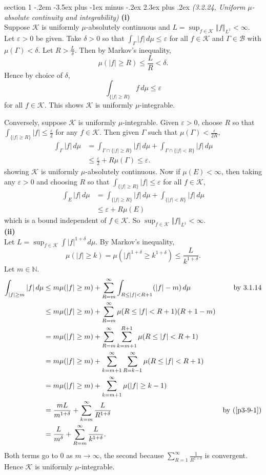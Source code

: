 \documentclass[12pt]{article}
\makeatletter
\theoremstyle{norm}
\newcommand{\N}[0]{\mathbb{N}}
\providecommand{\cal}[1]{\mathcal{#1}}
\renewcommand{\cal}[1]{\mathcal{#1}}
\newcommand{\rc}[1]{\frac{1}{#1}}
\newcommand{\Ga}[0]{\Gamma}
\newcommand{\de}[0]{\delta}
\newcommand{\ep}[0]{\varepsilon}
\newcommand{\eph}[0]{\frac{\varepsilon}{2}}
\newcommand{\by}[1]{\text{by~(\ref{#1})}}
\newcommand{\subprob}[1]{\noindent\textbf{#1}\\}
\newcommand{\iy}[0]{\infty}
\newcommand{\nl}[1]{\left \Vert #1\right \Vert_{L^1}}
\newenvironment{problem}{\@startsection
       {section}
       {1}
       {-.2em}
       {-3.5ex plus -1ex minus -.2ex}
       {2.3ex plus .2ex}
       {\pagebreak[3]%
       \large\bf\noindent{Problem }
       }
       }
       {%
       }
\makeatother
\begin{document}
\begin{problem}{\it(3.2.24, Uniform $\mu$-absolute continuity and integrability)}
\subprob{(i)}
Suppose $\cal K$ is uniformly $\mu$-absolutely continuous and $L=\sup_{f\in \cal K} \nl{f}<\iy$. Let $\ep>0$ be given. Take $\de>0$ so that $\int_{\Ga} |f|\,d\mu\le \ep$ for all $f\in \cal K$ and $\Ga\in \cal B$ with $\mu(\Ga)<\de$. Let $R>\frac{L}{\de}$. Then 
by Markov's inequality,
\[
\mu(|f|\ge R)\le \frac{L}{R}<\de.
\]
Hence by choice of $\de$,
\[
\int_{\{|f|\ge R\}}f\,d\mu\le \ep
\]
for all $f\in \cal K$. This shows $\cal K$ is uniformly $\mu$-integrable.

Conversely, suppose $\cal K$ is uniformly $\mu$-integrable. Given $\ep>0$, 
choose $R$ so that $\int_{\{|f|\ge R\}}|f|\le \eph$ for any $f\in \cal K$. Then given $\Ga$ such that $\mu(\Ga)<\frac{\ep}{2R}$,
\begin{align*}
\int_{\Ga}|f|\,d\mu&=\int_{\Ga\cap \{|f|\ge R\}} |f|\,d\mu
+\int_{\Ga\cap \{|f|<R\}}|f|\,d\mu\\
&\le \eph+R\mu(\Ga)\le \ep.
\end{align*}
showing $\cal K$ is uniformly $\mu$-absolutely continuous.
Now if $\mu(E)<\iy$, then taking any $\ep>0$ and choosing $R$ so that $\int_{\{|f|\ge R\}}|f|\le \ep$ for all $f\in \cal K$,
\begin{align*}
 \int_E|f|\,d\mu &=\int_{\{|f|\ge R\}} |f|\,d\mu +\int_{\{|f|<R\}} |f|\,d\mu\\
&\le \ep+R\mu(E)
\end{align*}
which is a bound independent of $f\in \cal K$. So $\sup_{f\in \cal K}\nl{f}<\iy$.\\

\subprob{(ii)}
Let $L=\sup_{f\in \cal K}\int |f|^{1+\de}\,d\mu$. By Markov's inequality,
\begin{equation}\label{p3-9-1}
\mu(|f|\ge k)=\mu(|f|^{1+\de}\ge k^{1+\de})\le \frac{L}{k^{1+\de}}.
\end{equation}
Let $m\in \N$.
\begin{align*}
\int_{|f|\ge m}|f|\,d\mu&\le 
m\mu(|f|\ge m)+
\sum_{R=m}^{\iy}\int_{R\le |f|<R+1} (|f|-m)\,d\mu&\text{ by 3.1.14}\\
&\le m\mu(|f|\ge m)+\sum_{R=m}^{\iy}\mu(R\le |f|<R+1)(R+1-m)\\
&=m\mu(|f|\ge m)+\sum_{R=m}^{\iy}
\sum_{k=m+1}^{R+1}\mu(R\le |f|<R+1)
\\
&=m\mu(|f|\ge m)+\sum_{k=m+1}^{\iy}\sum_{R=k-1}^{\iy}\mu(R\le |f|<R+1)\\
&=m\mu(|f|\ge m)+\sum_{k=m+1}^{\iy}\mu(|f|\ge k-1)\\
&=\frac{mL}{m^{1+\de}}+\sum_{k=m}^{\iy}\frac{L}{R^{1+\de}}&\by{p3-9-1}\\
&=\frac{L}{m^{\de}}+\sum_{R=m}^{\infty} \frac{L}{k^{1+\de}}.
\end{align*}
Both terms go to 0 as $m\to \iy$, the second because $\sum_{R=1}^{\iy}\rc{R^{1+\de}}$ is convergent. Hence $\cal K$ is uniformly $\mu$-integrable.\\


\end{problem}
\end{document}
